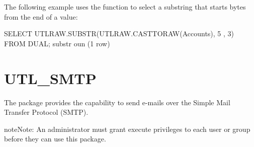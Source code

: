 \documentclass[letterpaper,10pt,english,openany,oneside]{sphinxmanual}
\begin{document}
The following example uses the  function to select a substring
that starts  bytes from the end of a  value:

%
\begin{sphinxVerbatim}[commandchars=\\\{\}]
SELECT UTL\PYGZus{}RAW.SUBSTR(UTL\PYGZus{}RAW.CAST\PYGZus{}TO\PYGZus{}RAW(\PYGZsq{}Accounts\PYGZsq{}), \PYGZhy{}5 , 3) FROM
DUAL;
substr
\PYGZhy{}\PYGZhy{}\PYGZhy{}\PYGZhy{}\PYGZhy{}\PYGZhy{}\PYGZhy{}\PYGZhy{}
oun
(1 row)
\end{sphinxVerbatim}

\newpage


\section{UTL\_SMTP}
\label{\detokenize{utl_smtp::doc}}\label{\detokenize{utl_smtp:utl-smtp}}
The  package provides the capability to send e-mails over the
Simple Mail Transfer Protocol (SMTP).

\begin{sphinxadmonition}{note}{Note:}
An administrator must grant execute privileges to each user or group before they can use this package.
\end{sphinxadmonition}
\end{document}
